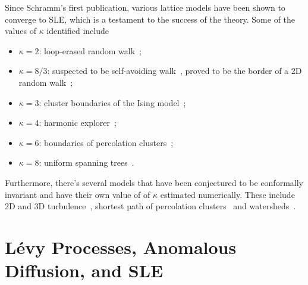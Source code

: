 Since Schramm's first publication, various lattice models have been shown to
converge to SLE, which is a testament to the success of the theory. Some of the
values of $\kappa$ identified include
\begin{itemize}
    \item $\kappa=2$: loop-erased random walk~\cite{Schramm2000};
    \item $\kappa=8/3$: suspected to be self-avoiding walk~\cite{Kennedy2002},
        proved to be the border of a 2D random walk~\cite{Lawler2001};
    \item $\kappa=3$: cluster boundaries of the Ising model~\cite{Chelkak2014};
    \item $\kappa=4$: harmonic explorer~\cite{Schramm2005};
    \item $\kappa=6$: boundaries of percolation clusters~\cite{Smirnov2001b};
    \item $\kappa=8$: uniform spanning trees~\cite{Schramm2000}.
\end{itemize}
Furthermore, there's several models that have been conjectured to be
conformally invariant and have their own value of of $\kappa$ estimated
numerically. These include 2D and 3D turbulence~\cite{Bernard2006,
Thalabard2011}, shortest path of percolation clusters~\cite{Pose2014} and
watersheds~\cite{Daryaei2012}.


\section{Lévy Processes, Anomalous Diffusion, and SLE}
\label{sec:levy}

